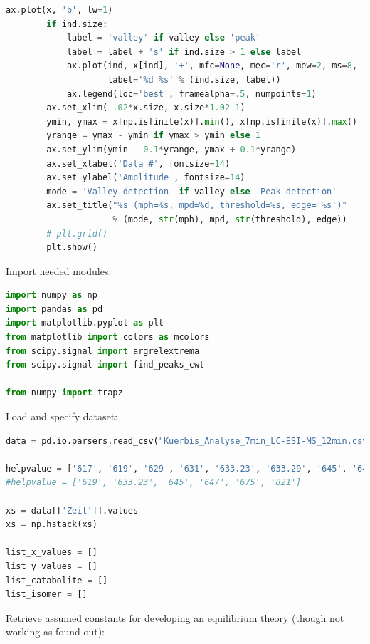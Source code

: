 \begin{lstlisting}[language=Python]
        ax.plot(x, 'b', lw=1)
        if ind.size:
            label = 'valley' if valley else 'peak'
            label = label + 's' if ind.size > 1 else label
            ax.plot(ind, x[ind], '+', mfc=None, mec='r', mew=2, ms=8,
                    label='%d %s' % (ind.size, label))
            ax.legend(loc='best', framealpha=.5, numpoints=1)
        ax.set_xlim(-.02*x.size, x.size*1.02-1)
        ymin, ymax = x[np.isfinite(x)].min(), x[np.isfinite(x)].max()
        yrange = ymax - ymin if ymax > ymin else 1
        ax.set_ylim(ymin - 0.1*yrange, ymax + 0.1*yrange)
        ax.set_xlabel('Data #', fontsize=14)
        ax.set_ylabel('Amplitude', fontsize=14)
        mode = 'Valley detection' if valley else 'Peak detection'
        ax.set_title("%s (mph=%s, mpd=%d, threshold=%s, edge='%s')"
                     % (mode, str(mph), mpd, str(threshold), edge))
        # plt.grid()
        plt.show()
\end{lstlisting}

Import needed modules:

\begin{lstlisting}[language=Python]
import numpy as np
import pandas as pd
import matplotlib.pyplot as plt
from matplotlib import colors as mcolors
from scipy.signal import argrelextrema
from scipy.signal import find_peaks_cwt

from numpy import trapz
\end{lstlisting}

Load and specify dataset:

\begin{lstlisting}[language=Python]
data = pd.io.parsers.read_csv("Kuerbis_Analyse_7min_LC-ESI-MS_12min.csv")

helpvalue = ['617', '619', '629', '631', '633.23', '633.29', '645', '647.27', '647.31', '659.23', '659.27', '661', '675', '793', '795', '807', '809', '821']
#helpvalue = ['619', '633.23', '645', '647', '675', '821']

xs = data[['Zeit']].values
xs = np.hstack(xs)

list_x_values = []
list_y_values = []
list_catabolite = []
list_isomer = []
\end{lstlisting}

Retrieve assumed constants for developing an equilibrium theory (though
not working as found out):

